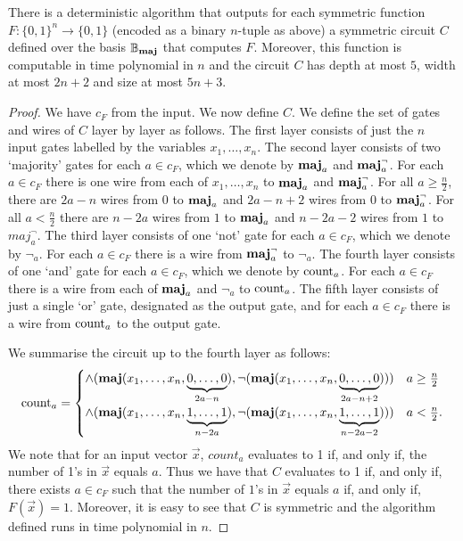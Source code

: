 \documentclass[../paper.tex]{subfiles}
\begin{document}
\begin{prop}
  \label{prop:fuctions-maj}
  There is a deterministic algorithm that outputs for each symmetric function
  $F: \{0,1\}^n \rightarrow \{0,1\}$ (encoded as a binary $n$-tuple as above) a
  symmetric circuit $C$ defined over the basis $\mathbb{B}_{\text{\textbf{maj}}}$ that computes
  $F$. Moreover, this function is computable in time polynomial in $n$ and the
  circuit $C$ has depth at most $5$, width at most $2n+2$ and size at most $5n +
  3$.
\end{prop}

\begin{proof}
  We have $c_{F}$ from the input. We now define $C$. We define the set of gates
  and wires of $C$ layer by layer as follows. The first layer consists of just
  the $n$ input gates labelled by the variables $x_1, \ldots , x_n$. The second
  layer consists of two `majority' gates for each $a \in c_{F}$, which we denote
  by $\text{\textbf{maj}}_a$ and $\text{\textbf{maj}}^{\neg}_a$. For each $a \in c_{F}$ there is one wire from
  each of $x_1, \ldots , x_n$ to $\text{\textbf{maj}}_a$ and $\text{\textbf{maj}}^{\neg}_a$. For all $a \geq
  \frac{n}{2}$, there are $2a - n$ wires from $0$ to $\text{\textbf{maj}}_a$ and $2a - n + 2$
  wires from $0$ to $\text{\textbf{maj}}^{\neg}_a$. For all $a < \frac{n}{2}$ there are $n -
  2a$ wires from $1$ to $\text{\textbf{maj}}_a$ and $n - 2a - 2$ wires from $1$ to
  $maj^{\neg}_a$. The third layer consists of one `not' gate for each $a \in
  c_{F}$, which we denote by $\neg_a$. For each $a \in c_{F}$ there is a wire
  from $\text{\textbf{maj}}^\neg_a$ to $\neg_a$. The fourth layer consists of one `and' gate
  for each $a \in c_{F}$, which we denote by $\text{count}_a$. For each $a \in
  c_{F}$ there is a wire from each of $\text{\textbf{maj}}_a$ and $\neg_a$ to $\text{count}_a$.
  The fifth layer consists of just a single `or' gate, designated as the output
  gate, and for each $a \in c_{F}$ there is a wire from $\text{count}_a$ to the
  output gate.

  We summarise the circuit up to the fourth layer as follows:
  \[
    \text{count}_a = \begin{cases} \land ( \text{\textbf{maj}} ( x_1, \ldots, x_n, \underbrace
      {0, \ldots, 0}_{2a - n} ), \neg ( \text{\textbf{maj}} (x_1, \ldots , x_n, \underbrace{0,
        \ldots,
        0}_{2a - n + 2} ) )) &  a \geq \frac{n}{2} \\
      \land ( \text{\textbf{maj}} ( x_1, \ldots, x_n, \underbrace {1, \ldots, 1}_{n - 2a} ),
      \neg ( \text{\textbf{maj}} ( x_1, \ldots , x_n, \underbrace{1, \ldots, 1}_{n - 2a -2} )
      )) & a < \frac{n}{2}.
    \end{cases}
  \]
  We note that for an input vector $\vec{x}$, $count_a$ evaluates to 1 if, and
  only if, the number of 1's in $\vec{x}$ equals $a$. Thus we have that $C$
  evaluates to 1 if, and only if, there exists $a \in c_{F}$ such that the
  number of $1$'s in $\vec{x}$ equals $a$ if, and only if, $F (\vec{x}) = 1$.
  Moreover, it is easy to see that $C$ is symmetric and the algorithm defined
  runs in time polynomial in $n$.


\end{proof}
\end{document}
